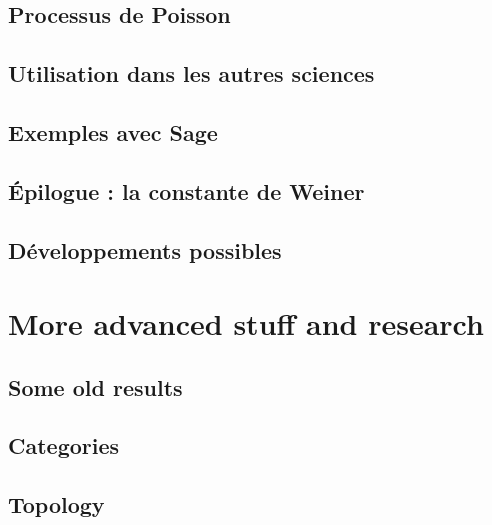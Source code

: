 \documentclass[a4paper,twoside,11pt]{book}
\begin{document}
\chapter{Processus de Poisson}


\chapter{Utilisation dans les autres sciences}



\chapter{Exemples avec Sage}


\chapter{Épilogue : la constante de Weiner}



\chapter{Développements possibles}



\emptyInputPath
{}

\part{More advanced stuff and research}



\chapter{Some old results}


\chapter{Categories}        \label{chap_category}


\chapter{Topology}              \label{chap_topology}


\end{document}
